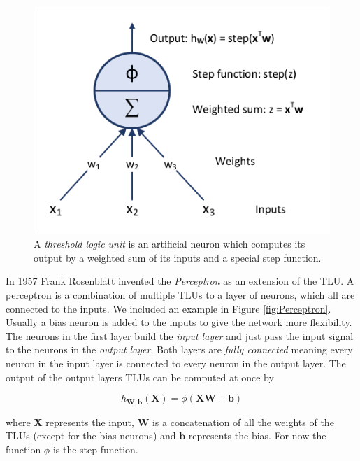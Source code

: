 \begin{figure}[ht]
  
  \begin{center}
      \includegraphics[trim=10px 10px 10px 10px, clip, width=0.5\columnwidth]{figures/deeplearning/TLU.pdf}
  \end{center}
  
  \caption[Threshold Logic Unit]{A \textit{threshold logic unit} is an artificial neuron which computes its output by a weighted sum of its inputs and a special step function.}
  \label{fig:TLU}
\end{figure}

 In 1957 Frank Rosenblatt invented the \textit{Perceptron} as an extension of the TLU. A perceptron is a combination of multiple TLUs to a layer of neurons, which all are connected to the inputs. We included an example in Figure \ref{fig:Perceptron}. Usually a bias neuron is added to the inputs to give the network more flexibility. The neurons in the first layer build the \textit{input layer} and just pass the input signal to the neurons in the \textit{output layer}. Both layers are \textit{fully connected} meaning every neuron in the input layer is connected to every neuron in the output layer. The output of the output layers TLUs can be computed at once by 

 \[h_{\mathbf{W}, \mathbf{b}}(\mathbf{X}) = \phi(\mathbf{XW} + \mathbf{b})\]

where $\mathbf{X}$ represents the input, $\mathbf{W}$ is a concatenation of all the weights of the TLUs (except for the bias neurons) and $\mathbf{b}$ represents the bias. For now the function $\phi$ is the step function. 

